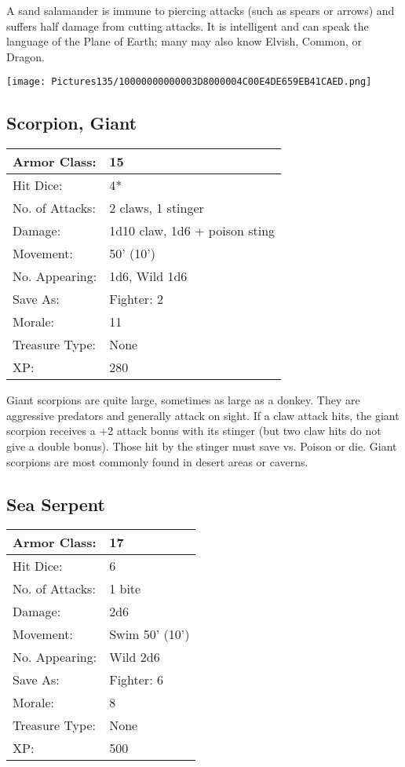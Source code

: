 \documentclass[a4paper,twoside,openany,10pt]{book}
\begin{document}
\begin{multicols}{2}
A sand salamander is immune to piercing attacks (such as spears or arrows) and suffers half damage from cutting attacks. It is intelligent and can speak the language of the Plane of Earth; many may also know Elvish, Common, or Dragon.

\begin{center} \texttt{[image: Pictures135/10000000000003D8000004C00E4DE659EB41CAED.png]} \end{center}


\subsection*{Scorpion, Giant}\label{scorpion-giant}

\begin{tabularx}{0.50\textwidth}{@{}lX@{}}
Armor Class: & 15 \\\hline
Hit Dice: & 4* \\\hline
No. of Attacks: & 2 claws, 1 stinger \\\hline
Damage: & 1d10 claw, 1d6 + poison sting \\\hline
Movement: & 50' (10') \\\hline
No. Appearing: & 1d6, Wild 1d6 \\\hline
Save As: & Fighter: 2 \\\hline
Morale: & 11 \\\hline
Treasure Type: & None \\\hline
XP: & 280 \\\hline
\end{tabularx}\medskip

Giant scorpions are quite large, sometimes as large as a donkey. They are aggressive predators and generally attack on sight. If a claw attack hits, the giant scorpion receives a +2 attack bonus with its stinger (but two claw hits do not give a double bonus). Those hit by the stinger must save vs. Poison or die. Giant scorpions are most commonly found in desert areas or caverns.

\subsection*{Sea Serpent}\label{sea-serpent}

\begin{tabularx}{0.50\textwidth}{@{}lX@{}}
Armor Class: & 17 \\\hline
Hit Dice: & 6 \\\hline
No. of Attacks: & 1 bite \\\hline
Damage: & 2d6 \\\hline
Movement: & Swim 50' (10') \\\hline
No. Appearing: & Wild 2d6 \\\hline
Save As: & Fighter: 6 \\\hline
Morale: & 8 \\\hline
Treasure Type: & None \\\hline
XP: & 500 \\\hline
\end{tabularx}\medskip


\end{multicols}
\end{document}
